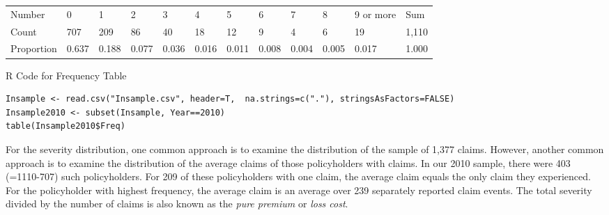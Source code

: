 \documentclass[]{book}
\begin{document}
\begin{longtable}[]{@{}llllllllllll@{}}
\begin{minipage}[b]{0.08\columnwidth}
\strut
\end{minipage} & \begin{minipage}[b]{0.08\columnwidth}\raggedright\strut
\strut
\end{minipage} & \begin{minipage}[b]{0.08\columnwidth}\raggedright\strut
\strut
\end{minipage} & \begin{minipage}[b]{0.08\columnwidth}\raggedright\strut
\strut
\end{minipage} & \begin{minipage}[b]{0.08\columnwidth}\raggedright\strut
\strut
\end{minipage} & \begin{minipage}[b]{0.08\columnwidth}\raggedright\strut
\strut
\end{minipage} & \begin{minipage}[b]{0.08\columnwidth}\raggedright\strut
\strut
\end{minipage} & \begin{minipage}[b]{0.08\columnwidth}\raggedright\strut
\strut
\end{minipage} & \begin{minipage}[b]{0.08\columnwidth}\raggedright\strut
\strut
\end{minipage}\tabularnewline
\midrule
\endhead
Number & 0 & 1 & 2 & 3 & 4 & 5 & 6 & 7 & 8 & 9 or more &
Sum\tabularnewline
Count & 707 & 209 & 86 & 40 & 18 & 12 & 9 & 4 & 6 & 19 &
1,110\tabularnewline
Proportion & 0.637 & 0.188 & 0.077 & 0.036 & 0.016 & 0.011 & 0.008 &
0.004 & 0.005 & 0.017 & 1.000\tabularnewline
\bottomrule
\end{longtable}

R Code for Frequency Table

\hypertarget{display.T:Frequency.2}{}
\begin{verbatim}
Insample <- read.csv("Insample.csv", header=T,  na.strings=c("."), stringsAsFactors=FALSE)
Insample2010 <- subset(Insample, Year==2010)
table(Insample2010$Freq)
\end{verbatim}

For the severity distribution, one common approach is to examine the
distribution of the sample of 1,377 claims. However, another common
approach is to examine the distribution of the average claims of those
policyholders with claims. In our 2010 sample, there were 403
(=1110-707) such policyholders. For 209 of these policyholders with one
claim, the average claim equals the only claim they experienced. For the
policyholder with highest frequency, the average claim is an average
over 239 separately reported claim events. The total severity divided by
the number of claims is also known as the \emph{pure premium} or
\emph{loss cost}.
\end{document}
